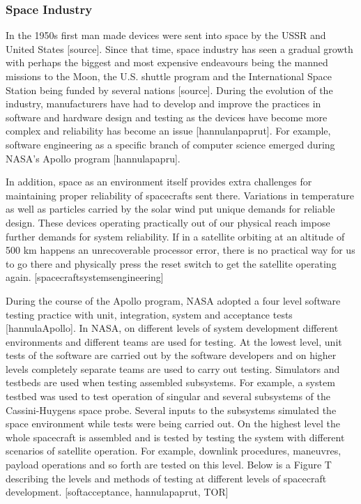\documentclass[english,12pt,a4paper,pdftex,elec,utf8]{aaltothesis}
\begin{document}
\subsubsection{Space Industry}
In the 1950s first man made devices were sent into space by the USSR and United States [source]. Since that time, space industry has seen a gradual growth with perhaps the biggest and most expensive endeavours being the manned missions to the Moon, the U.S. shuttle program and the International Space Station being funded by several nations [source]. During the evolution of the industry, manufacturers have had to develop and improve the practices in software and hardware design and testing as the devices have become more complex and reliability has become an issue [hannulanpaprut]. For example, software engineering as a specific branch of computer science emerged during NASA's Apollo program [hannulapapru].\par 
In addition, space as an environment itself provides extra challenges for maintaining proper reliability of spacecrafts sent there. Variations in temperature as well as particles carried by the solar wind put unique demands for reliable design. These devices operating practically out of our physical reach impose further demands for system reliability. If in a satellite orbiting at an altitude of 500 km happens an unrecoverable processor error, there is no practical way for us to go there and physically press the reset switch to get the satellite operating again. [spacecraftsystemsengineering] \par
During the course of the Apollo program, NASA adopted a four level software testing practice with unit, integration, system and acceptance tests [hannulaApollo]. In NASA, on different levels of system development different environments and different teams are used for testing. At the lowest level, unit tests of the software are carried out by the software developers and on higher levels completely separate teams are used to carry out testing. Simulators and testbeds are used when testing assembled subsystems. For example, a system testbed was used to test operation of singular and several subsystems of the Cassini-Huygens space probe. Several inputs to the subsystems simulated the space environment while tests were being carried out.   On the highest level the whole spacecraft is assembled and is tested by testing the system with different scenarios of satellite operation. For example, downlink procedures, maneuvres, payload operations and so forth are tested on this level. Below is a Figure T describing the levels and methods of testing at different levels of spacecraft development. [softacceptance, hannulapaprut, TOR] \par
\end{document}
